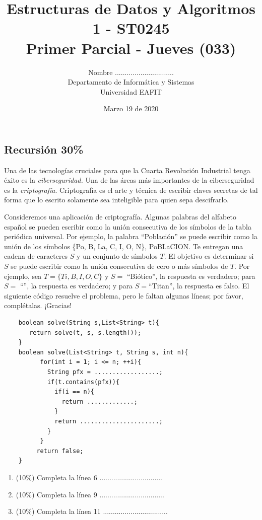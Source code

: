 \documentclass[10 pt]{article}
\title{\textbf {Estructuras de Datos y Algoritmos 1 - ST0245\\Primer Parcial - Jueves (033)}}
\author{Nombre ..............................\\
	Departamento de Informática y Sistemas\\
	Universidad EAFIT\\}
\date{Marzo 19 de 2020}
\begin{document}
	\lstset{escapechar=@,style=customc, numbers=left, stepnumber = 1} 
	\maketitle
	\begin{multicols}{2}

\section{Recursión 30\%}
        Una de las tecnologías cruciales para que la Cuarta Revolución Industrial tenga éxito es la \textit{ciberseguridad.} 
        Una de las áreas más importantes de la ciberseguridad es la \textit{criptografía}. Criptografía es el arte y técnica de escribir claves secretas de tal forma que lo escrito solamente sea inteligible para quien sepa descifrarlo.

         Consideremos una aplicación de criptografía. Algunas palabras del alfabeto español se pueden escribir como la unión consecutiva de los símbolos de la tabla periódica universal. Por ejemplo, la palabra ``Población'' se puede escribir como la unión de los símbolos \{Po, B, La, C, I, O, N\}, PoBLaCION. Te entregan una cadena de caracteres $S$ y un conjunto de símbolos $T$. El objetivo es determinar si $S$ se puede escribir como la unión consecutiva de cero o más símbolos de $T$. Por ejemplo, sea $T = \{Ti, B, I, O, C\}$ y $S = $ ``Biótico'', la respuesta es verdadero; para $S = $ ``'', la respuesta es verdadero; y para $S = $``Titan'', la respuesta es falso. 
		 El siguiente código resuelve el problema, pero le faltan algunas líneas; por favor, complétalas. ¡Gracias!
		 {\small
		\begin{lstlisting}
	boolean solve(String s,List<String> t){
	   return solve(t, s, s.length());
	}
	boolean solve(List<String> t, String s, int n){
		  for(int i = 1; i <= n; ++i){
		    String pfx = ..................;
		    if(t.contains(pfx)){
		      if(i == n){
		        return .............;
		      }
		      return ......................;
		    }
		  }
		 return false;
	}
		\end{lstlisting}
		}
		\begin{enumerate}[label=\Alph*]
			\item (10\%) Completa la línea 6 ................................
			\item (10\%) Completa la línea 9
			.................................
			\item (10\%) Completa la línea 11
			.................................
		\end{enumerate}


\end{multicols}
\end{document}
